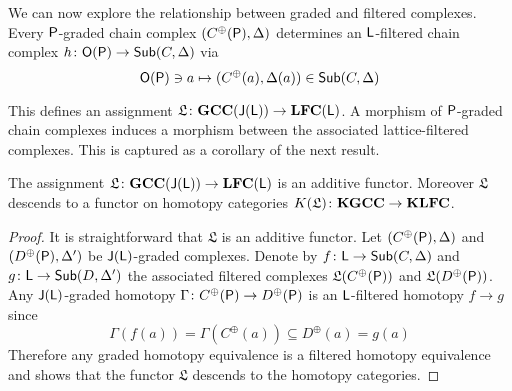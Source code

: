 % 
  
  
 We can now explore the relationship between graded and filtered complexes.  Every ${\mathsf P}$-graded chain complex $(C^\oplus({\mathsf P}),\Delta)$ determines an ${\mathsf L}$-filtered chain complex $h\colon {\mathsf O}({\mathsf P})\to \mathsf{Sub}(C,\Delta)$ via $${\mathsf O}({\mathsf P})\ni a \mapsto (C^\oplus(a),\Delta(a))\in \mathsf{Sub}(C,\Delta)$$


This defines an assignment $\mathfrak{L}\colon {\bf GCC}({\mathsf J}({\mathsf L}))\to {\bf LFC}({\mathsf L})$.  A morphism of ${\mathsf P}$-graded chain complexes induces a morphism between the associated lattice-filtered complexes.  This is captured as a corollary of the next result.


\begin{prop}\label{prop:filt:functor}
The assignment $\mathfrak{L}\colon {\bf GCC}({\mathsf J}({\mathsf L}))\to {\bf LFC}({\mathsf L})$ is an additive functor.  Moreover $\mathfrak{L}$ descends to a functor on homotopy categories $K(\mathfrak{L})\colon  {\bf KGCC} \to {\bf KLFC}$.
\end{prop}
\begin{proof}
It is straightforward that $\mathfrak{L}$ is an additive functor.  Let $(C^\oplus({\mathsf P}),\Delta)$ and  $(D^\oplus({\mathsf P}),\Delta')$  be ${\mathsf J}({\mathsf L})$-graded complexes.  Denote by $f\colon {\mathsf L}\to \mathsf{Sub}(C,\Delta)$ and $g\colon {\mathsf L}\to \mathsf{Sub}(D,\Delta')$ the associated filtered complexes $\mathfrak{L}(C^\oplus({\mathsf P}))$ and $\mathfrak{L}(D^\oplus({\mathsf P}))$.  Any ${\mathsf J}({\mathsf L})$-graded homotopy $\Gamma\colon C^\oplus({\mathsf P})\to D^\oplus({\mathsf P})$ is an ${\mathsf L}$-filtered homotopy $f\to g$ since
\[
\Gamma(f(a))= \Gamma(C^\oplus(a)) \subseteq D^\oplus(a) = g(a)
\]
Therefore any graded homotopy equivalence is a filtered homotopy equivalence and  shows that the functor $\mathfrak{L}$ descends to the homotopy categories.
\end{proof}


